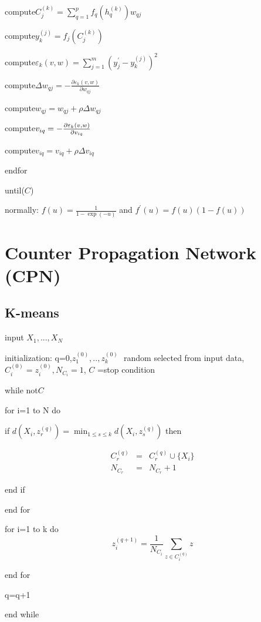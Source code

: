 \documentclass{article}
\begin{document}
\qquad \qquad compute\qquad $C_{j}^{(k)}=%
\sum_{q=1}^{p}f_{q}(h_{q}^{(k)})w_{qj}$

\qquad \qquad compute\qquad $y_{k}^{(j)}=f_{j}(C_{j}^{(k)})$

\qquad \qquad compute\qquad $\varepsilon
_{k}(v,w)=\sum_{j=1}^{m}(y_{j}^{\prime }-y_{k}^{(j)})^{2}$

\qquad \qquad compute\qquad $\Delta w_{qj}=-\frac{\partial \varepsilon
_{k}(v,w)}{\partial w_{qj}}$

\qquad \qquad compute\qquad $w_{qj}=w_{qj}+\rho \Delta w_{qj}$

\qquad \qquad compute\qquad $v_{iq}=-\frac{\partial \varepsilon _{k}(v,w)}{%
\partial v_{iq}}$

\qquad \qquad compute\qquad $v_{iq}=v_{iq}+\rho \Delta v_{iq}$

\qquad endfor

until($C$)

normally: $f(u)=\frac{1}{1-\exp (-u)}$ and $f^{\prime }(u)=f(u)(1-f(u))$

\section{Counter Propagation Network (CPN)}

\subsection{K-means}

input $X_{1},...,X_{N}$

initialization: q=0,$z_{1}^{(0)},..,z_{k}^{(0)}\,$\ random selected from
input data, $C_{i}^{(0)}=z_{i}^{(0)},N_{C_{i}}=1$, $C$ =stop condition

while not$C$

\qquad for i=1 to N do

\qquad \qquad if $d(X_{i},z_{r}^{(q)})=\min_{1\leq s\leq
k}d(X_{i},z_{s}^{(q)})$ then

\begin{eqnarray*}
C_{r}^{(q)} &=&C_{r}^{(q)}\cup \{X_{i}\} \\
N_{C_{r}} &=&N_{C_{r}}+1
\end{eqnarray*}

\qquad \qquad end if

\qquad end for

\qquad for i=1 to k do%
\[
z_{i}^{(q+1)}=\frac{1}{N_{C_{i}}}\sum_{z\in C_{i}^{(q)}}z
\]

\qquad end for

\qquad q=q+1

end while

\qquad 
\end{document}
